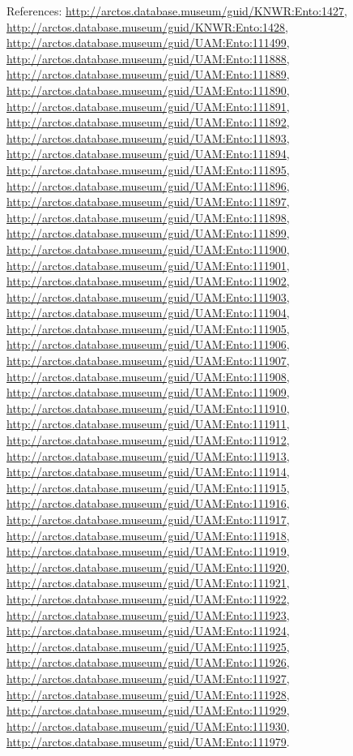 \documentclass[9pt, article]{memoir}
\begin{document}
\begin{multicols}{2}
\vspace{6pt}References: 
\url{http://arctos.database.museum/guid/KNWR:Ento:1427}, 
\url{http://arctos.database.museum/guid/KNWR:Ento:1428}, 
\url{http://arctos.database.museum/guid/UAM:Ento:111499}, 
\url{http://arctos.database.museum/guid/UAM:Ento:111888}, 
\url{http://arctos.database.museum/guid/UAM:Ento:111889}, 
\url{http://arctos.database.museum/guid/UAM:Ento:111890}, 
\url{http://arctos.database.museum/guid/UAM:Ento:111891}, 
\url{http://arctos.database.museum/guid/UAM:Ento:111892}, 
\url{http://arctos.database.museum/guid/UAM:Ento:111893}, 
\url{http://arctos.database.museum/guid/UAM:Ento:111894}, 
\url{http://arctos.database.museum/guid/UAM:Ento:111895}, 
\url{http://arctos.database.museum/guid/UAM:Ento:111896}, 
\url{http://arctos.database.museum/guid/UAM:Ento:111897}, 
\url{http://arctos.database.museum/guid/UAM:Ento:111898}, 
\url{http://arctos.database.museum/guid/UAM:Ento:111899}, 
\url{http://arctos.database.museum/guid/UAM:Ento:111900}, 
\url{http://arctos.database.museum/guid/UAM:Ento:111901}, 
\url{http://arctos.database.museum/guid/UAM:Ento:111902}, 
\url{http://arctos.database.museum/guid/UAM:Ento:111903}, 
\url{http://arctos.database.museum/guid/UAM:Ento:111904}, 
\url{http://arctos.database.museum/guid/UAM:Ento:111905}, 
\url{http://arctos.database.museum/guid/UAM:Ento:111906}, 
\url{http://arctos.database.museum/guid/UAM:Ento:111907}, 
\url{http://arctos.database.museum/guid/UAM:Ento:111908}, 
\url{http://arctos.database.museum/guid/UAM:Ento:111909}, 
\url{http://arctos.database.museum/guid/UAM:Ento:111910}, 
\url{http://arctos.database.museum/guid/UAM:Ento:111911}, 
\url{http://arctos.database.museum/guid/UAM:Ento:111912}, 
\url{http://arctos.database.museum/guid/UAM:Ento:111913}, 
\url{http://arctos.database.museum/guid/UAM:Ento:111914}, 
\url{http://arctos.database.museum/guid/UAM:Ento:111915}, 
\url{http://arctos.database.museum/guid/UAM:Ento:111916}, 
\url{http://arctos.database.museum/guid/UAM:Ento:111917}, 
\url{http://arctos.database.museum/guid/UAM:Ento:111918}, 
\url{http://arctos.database.museum/guid/UAM:Ento:111919}, 
\url{http://arctos.database.museum/guid/UAM:Ento:111920}, 
\url{http://arctos.database.museum/guid/UAM:Ento:111921}, 
\url{http://arctos.database.museum/guid/UAM:Ento:111922}, 
\url{http://arctos.database.museum/guid/UAM:Ento:111923}, 
\url{http://arctos.database.museum/guid/UAM:Ento:111924}, 
\url{http://arctos.database.museum/guid/UAM:Ento:111925}, 
\url{http://arctos.database.museum/guid/UAM:Ento:111926}, 
\url{http://arctos.database.museum/guid/UAM:Ento:111927}, 
\url{http://arctos.database.museum/guid/UAM:Ento:111928}, 
\url{http://arctos.database.museum/guid/UAM:Ento:111929}, 
\url{http://arctos.database.museum/guid/UAM:Ento:111930}, 
\url{http://arctos.database.museum/guid/UAM:Ento:111979}.


\end{multicols}
\end{document}
